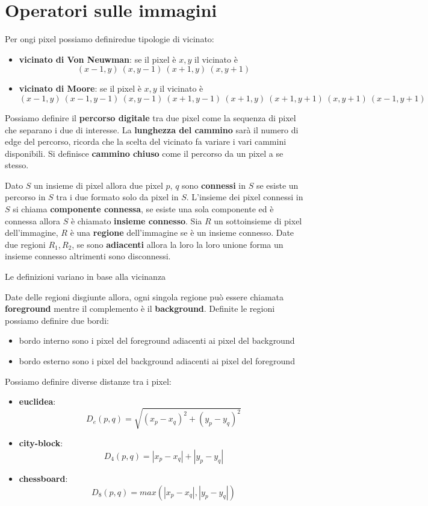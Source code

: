 \chapter{Operatori sulle immagini}
Per ongi pixel possiamo definiredue tipologie di vicinato:
\begin{itemize}
    \item \textbf{vicinato di Von Neuwman}: se il pixel è $x,y$ il vicinato è
    $$(x-1, y) \ (x, y-1) \ (x+1, y) \ (x, y+1) $$
    \item \textbf{vicinato di Moore}: se il pixel è $x,y$ il vicinato è
    $$(x-1, y) \ (x-1, y-1) \ (x, y-1) \ (x+1, y-1) \ (x+1, y) \ (x+1, y+1) \ (x, y+1) \ (x-1, y+1) $$
\end{itemize}

Possiamo definire il \textbf{percorso digitale} tra due pixel come la sequenza di 
pixel che separano i due di interesse. La \textbf{lunghezza del cammino} sarà il numero 
di edge del percorso, ricorda che la scelta del vicinato fa variare i vari cammini 
disponibili. Si definisce \textbf{cammino chiuso} come il percorso da un pixel a 
se stesso.

Dato $S$ un insieme di pixel allora due pixel $p$, $q$ sono \textbf{connessi} in $S$ 
se esiste un percorso in $S$ tra i due formato solo da pixel in $S$. L'insieme 
dei pixel connessi in $S$ si chiama \textbf{componente connessa}, se 
esiste una sola componente ed è connessa allora $S$ è chiamato \textbf{insieme connesso}.
Sia $R$ un sottoinsieme di pixel dell'immagine, $R$ è una \textbf{regione} dell'immagine  se è
un insieme connesso. Date due regioni $R_1,R_2$, se sono \textbf{adiacenti} allora la loro 
la loro unione forma un insieme connesso altrimenti sono disconnessi.

\begin{nota}
    Le definizioni variano in base alla vicinanza
\end{nota}

Date delle regioni disgiunte allora, ogni singola regione può essere chiamata \textbf{foreground}
mentre il complemento è il \textbf{background}. Definite le regioni possiamo 
definire due bordi:
\begin{itemize}
    \item bordo interno sono i pixel del foreground adiacenti ai pixel del background
    \item bordo esterno sono i pixel del background adiacenti ai pixel del foreground
\end{itemize}

Possiamo definire diverse distanze tra i pixel:
\begin{itemize}
    \item \textbf{euclidea}:
    $$D_e(p,q) = \sqrt{(x_p-x_q)^2+(y_p-y_q)^2}$$
    \item \textbf{city-block}:
    $$D_4(p,q) = |x_p-x_q|+|y_p-y_q|$$
    \item \textbf{chessboard}:
    $$D_8(p,q) = max(|x_p-x_q|,|y_p-y_q|)$$
\end{itemize}

